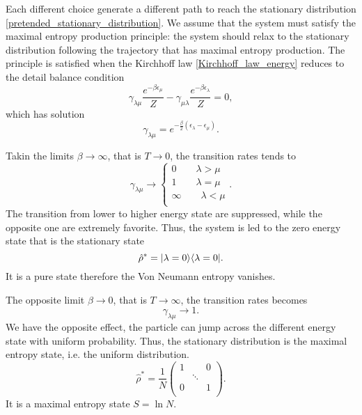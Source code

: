 Each different choice generate a different path to reach the stationary distribution \eqref{pretended_stationary_distribution}. We assume that the system must satisfy the maximal entropy production principle: the system should relax to the stationary distribution following the trajectory that has maximal entropy production. The principle is satisfied when the Kirchhoff law \eqref{Kirchhoff_law_energy} reduces to the detail balance condition
\begin{equation}
    \gamma_{\lambda\mu}\frac{e^{-\beta \epsilon_\mu}}{Z} - \gamma_{\mu\lambda}\frac{e^{-\beta \epsilon_\lambda}}{Z} = 0,
\end{equation}
which has solution
\begin{equation}\label{gamma_detailed_balance}
    \gamma_{\lambda\mu} = e^{-\frac{\beta}{2}\left(\epsilon_\lambda - \epsilon_\mu\right)}.
\end{equation}

Takin the limits $\beta \rightarrow \infty$, that is $T  \rightarrow 0$, the transition rates tends to
\begin{equation}
    \gamma_{\lambda\mu} \rightarrow \left\{\begin{aligned}
        0 \qquad \lambda > \mu\\
        1 \qquad \lambda = \mu\\
        \infty \qquad  \lambda < \mu \\
    \end{aligned}\right. . 
\end{equation}
The transition from lower to higher energy state are suppressed, while the opposite one are extremely favorite. Thus, the system is led to the zero energy state that is the stationary state
\begin{equation}\label{beta_inf_stationary_distribution}
    \hat\rho^* = \lvert\lambda = 0\rangle\langle\lambda = 0\rvert.
\end{equation} 
It is a pure state therefore the Von Neumann entropy vanishes.

The opposite limit $\beta \rightarrow 0$, that is $T \rightarrow \infty$, the transition rates becomes
\begin{equation}
    \gamma_{\lambda\mu} \rightarrow 1.
\end{equation}
We have the opposite effect, the particle can jump across the different energy state with uniform probability. Thus, the stationary distribution is the maximal entropy state, i.e. the uniform distribution.
\begin{equation}
    \hat\rho^* = \frac{1}{N}\begin{pmatrix}
        1&&0\\
        &\ddots&\\
        0&&1\\
    \end{pmatrix}.
\end{equation}
It is a maximal entropy state $S = \ln N$.

